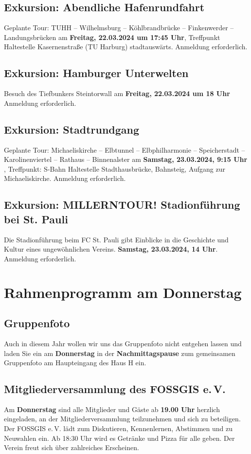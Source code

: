 \subsection*{Exkursion: Abendliche Hafenrundfahrt}
Geplante Tour: TUHH – Wilhelmsburg – Köhlbrandbrücke – Finkenwerder – Landungsbrücken am {\bfseries Freitag, 22.03.2024 um 17:45 Uhr}, Treffpunkt Haltestelle Kasernenstraße (TU Harburg) stadtauswärts. Anmeldung erforderlich.

\subsection*{Exkursion: Hamburger Unterwelten}
Besuch des Tiefbunkers Steintorwall am {\bfseries Freitag, 22.03.2024 um 18 Uhr }
Anmeldung erforderlich.

\subsection*{Exkursion: Stadtrundgang}
Geplante Tour: Michaeliskirche – Elbtunnel – Elbphilharmonie – Speicherstadt – Karolinenviertel – Rathaus – Binnenalster am {\bfseries Samstag, 23.03.2024, 9:15 Uhr }, Treffpunkt: S-Bahn Haltestelle Stadthausbrücke, Bahnsteig, Aufgang zur Michaeliskirche. Anmeldung erforderlich.

\subsection*{Exkursion: MILLERNTOUR! Stadionführung bei St. Pauli}
Die Stadionführung beim FC St. Pauli gibt Einblicke in die Geschichte und Kultur eines ungewöhnlichen Vereins. {\bfseries Samstag, 23.03.2024, 14 Uhr}. Anmeldung erforderlich.

\section*{Rahmenprogramm am Donnerstag}
\subsection*{Gruppenfoto}
Auch in diesem Jahr wollen wir uns das Gruppenfoto nicht entgehen lassen und laden Sie ein am {\bfseries Donnerstag} in der {\bfseries Nachmittagspause} zum gemeinsamen Gruppenfoto am Haupteingang des Haus H ein.

\subsection*{Mitgliederversammlung des FOSSGIS e.\,V.}
Am {\bfseries Donnerstag} sind alle Mitglieder und Gäste ab {\bfseries 19.00 Uhr} herzlich eingeladen, an der Mitgliederversammlung teilzunehmen und sich zu beteiligen. Der FOSSGIS e.\,V. lädt zum Diskutieren, Kennenlernen, Abstimmen und zu Neuwahlen ein. Ab 18:30 Uhr wird es Getränke und Pizza für alle geben. Der Verein freut sich über zahlreiches Erscheinen.

